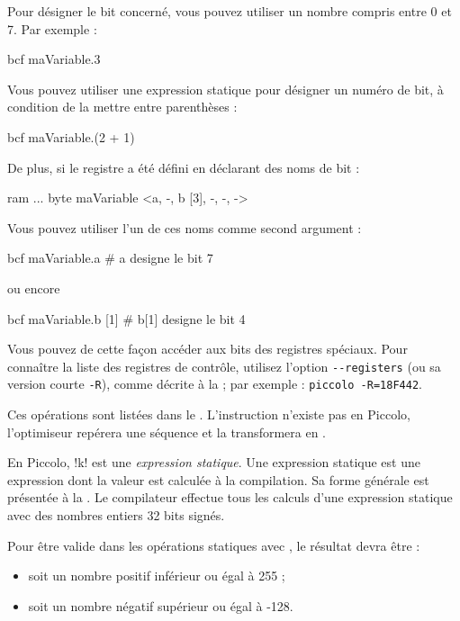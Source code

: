 Pour désigner le bit concerné, vous pouvez utiliser un nombre compris entre 0 et 7. Par exemple :
\begin{piccolo}
bcf maVariable.3
\end{piccolo}

Vous pouvez utiliser une expression statique pour désigner un numéro de bit, à condition de la mettre entre parenthèses :
\begin{piccolo}
bcf maVariable.(2 + 1)
\end{piccolo}

De plus, si le registre a été défini en déclarant des noms de bit :
\begin{piccolo}
ram ... {
  byte maVariable <a, -, b [3], -, -, ->
}
\end{piccolo}

Vous pouvez utiliser l’un de ces noms comme second argument :
\begin{piccolo}
bcf maVariable.a # a designe le bit 7
\end{piccolo}
ou encore
\begin{piccolo}
bcf maVariable.b [1] # b[1] designe le bit 4
\end{piccolo}

Vous pouvez de cette façon accéder aux bits des registres spéciaux. Pour connaître la liste des registres de contrôle, utilisez l’option \texttt{-{}-registers} (ou sa version courte \texttt{-R}), comme décrite à la  ; par exemple : \texttt{piccolo -R=18F442}.



Ces opérations sont listées dans le . L’instruction  n’existe pas en Piccolo, l’optimiseur repérera une séquence  et la transformera en .

En Piccolo, \pic!k! est une \emph{expression statique}. Une expression statique est une expression dont la valeur est calculée à la compilation. Sa forme générale est présentée à la . Le compilateur effectue tous les calculs d'une expression statique avec des nombres entiers 32 bits signés.

Pour être valide dans les opérations statiques avec , le résultat devra être :
\begin{itemize}
  \item soit un nombre positif inférieur ou égal à 255 ;
  \item soit un nombre négatif supérieur ou égal à -128.
\end{itemize}


